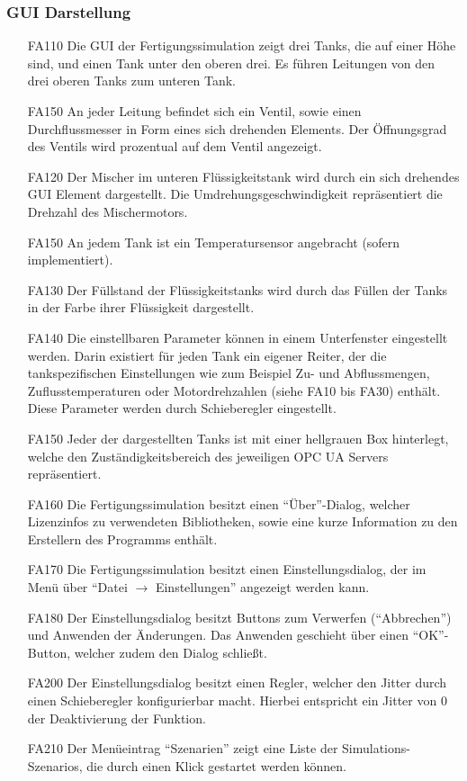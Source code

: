 \documentclass[parskip=full]{scrartcl}
\begin{document}
\subsubsection{GUI Darstellung}
\begin{enumerate}
\item[FA110] Die GUI der Fertigungssimulation zeigt drei Tanks, die auf einer Höhe sind, und einen Tank unter den oberen drei.
Es führen Leitungen von den drei oberen Tanks zum unteren Tank.
\item[FA150] An jeder Leitung befindet sich ein Ventil, sowie einen Durchflussmesser in Form eines sich drehenden Elements. Der Öffnungsgrad des Ventils wird prozentual auf dem Ventil angezeigt.
\item[FA120] Der Mischer im unteren Flüssigkeitstank wird durch ein sich drehendes GUI Element dargestellt.
Die Umdrehungsgeschwindigkeit repräsentiert die Drehzahl des Mischermotors.
\item[FA150] An jedem Tank ist ein Temperatursensor angebracht (sofern implementiert).
\item[FA130] Der Füllstand der Flüssigkeitstanks wird durch das Füllen der Tanks in der Farbe ihrer Flüssigkeit dargestellt.
\item[FA140] Die einstellbaren Parameter können in einem Unterfenster eingestellt werden. Darin existiert für jeden Tank ein eigener Reiter, der die 
tankspezifischen Einstellungen wie zum Beispiel Zu- und Abflussmengen, Zuflusstemperaturen oder Motordrehzahlen (siehe FA10 bis FA30) enthält.
Diese Parameter werden durch Schieberegler eingestellt.
\item[FA150] Jeder der dargestellten Tanks ist mit einer hellgrauen Box hinterlegt, welche den Zuständigkeitsbereich des jeweiligen OPC UA Servers repräsentiert.
\item[FA160] Die Fertigungssimulation besitzt einen "`Über"'-Dialog, welcher Lizenzinfos zu verwendeten Bibliotheken,
  sowie eine kurze Information zu den Erstellern des Programms enthält.
\item[FA170] Die Fertigungssimulation besitzt einen Einstellungsdialog, der im Menü über "`Datei $\rightarrow$ Einstellungen"' angezeigt werden kann.
\item[FA180] Der Einstellungsdialog besitzt Buttons zum Verwerfen ("`Abbrechen"') und Anwenden der Änderungen. Das Anwenden geschieht über einen "`OK"'-Button, welcher zudem den Dialog schließt.
\item[FA200] Der Einstellungsdialog besitzt einen Regler, welcher den \gls{Jitter} durch einen Schieberegler konfigurierbar macht.
  Hierbei entspricht ein \gls{Jitter} von 0 der Deaktivierung der Funktion.
\item[FA210] Der Menüeintrag "`Szenarien"' zeigt eine Liste der \glspl{Simulations-Szenario}, die durch einen Klick gestartet werden können.
\end{enumerate}
\end{document}
